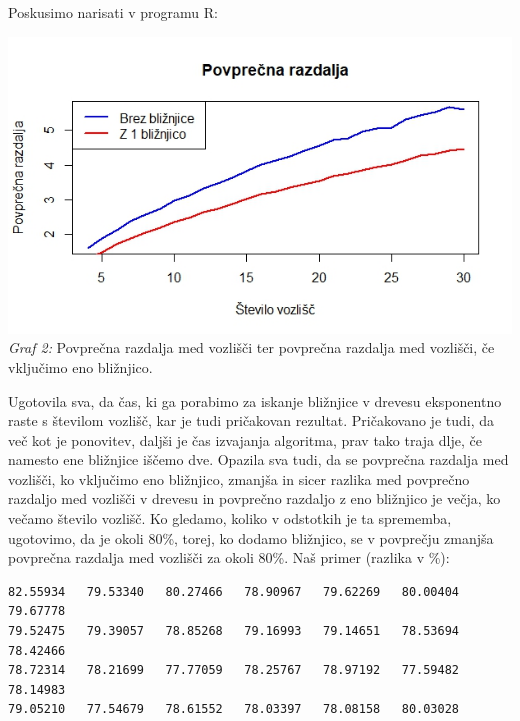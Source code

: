 \documentclass[a4paper,10pt]{article}
\begin{document}
Poskusimo narisati v programu R:
\begin{center}
\includegraphics[scale = 0.8]{povp_razd}\\ 
\scriptsize{\textit{Graf 2: } Povprečna razdalja med vozlišči ter povprečna razdalja med vozlišči, če vključimo eno bližnjico.}
\end{center}


Ugotovila sva, da čas, ki ga porabimo za iskanje bližnjice v drevesu eksponentno raste s številom vozlišč, kar je tudi pričakovan rezultat. Pričakovano je tudi, da več kot je ponovitev, daljši je čas izvajanja algoritma, prav tako traja dlje, če namesto ene bližnjice iščemo dve.
\newline
Opazila sva tudi, da se povprečna razdalja med vozlišči, ko vključimo eno bližnjico, zmanjša in sicer razlika med povprečno razdaljo med vozlišči v drevesu in povprečno razdaljo z eno bližnjico je večja, ko večamo število vozlišč. 
\newline
Ko gledamo, koliko v odstotkih je ta sprememba, ugotovimo, da je okoli 80\%, torej, ko dodamo bližnjico, se v povprečju zmanjša povprečna razdalja med vozlišči za okoli 80\%.
\newline
Naš primer (razlika v \%):
\begin{verbatim}
82.55934   79.53340   80.27466   78.90967   79.62269   80.00404   79.67778
79.52475   79.39057   78.85268   79.16993   79.14651   78.53694   78.42466
78.72314   78.21699   77.77059   78.25767   78.97192   77.59482   78.14983
79.05210   77.54679   78.61552   78.03397   78.08158   80.03028
\end{verbatim}
\end{document}
